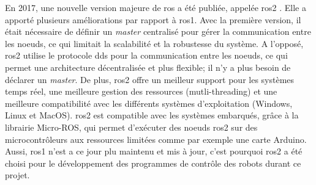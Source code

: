 En 2017, une nouvelle version majeure de \gls{ros} a été publiée, appelée \gls{ros2} \cite{noauthor_distributions_nodate}. Elle a apporté plusieurs améliorations par rapport à \gls{ros1}. Avec la première version, il était nécessaire de définir un \textit{master} centralisé pour gérer la communication entre les noeuds, ce qui limitait la scalabilité et la robustesse du système. A l'opposé, \gls{ros2} utilise le protocole \gls{dds} pour la communication entre les noeuds, ce qui permet une architecture décentralisée et plus flexible; il n'y a plus besoin de déclarer un \textit{master}. De plus, \gls{ros2} offre un meilleur support pour les systèmes temps réel, une meilleure gestion des ressources (mutli-threading) et une meilleure compatibilité avec les différents systèmes d'exploitation (Windows, Linux et MacOS). 
\gls{ros2} est compatible avec les systèmes embarqués, grâce à la librairie Micro-ROS, qui permet d'exécuter des noeuds \gls{ros2} sur des microcontrôleurs aux ressources limitées comme par exemple une carte Arduino. 
Aussi, \gls{ros1} n'est a ce jour plu maintenu et mis à jour, c'est pourquoi \gls{ros2} a été choisi pour le développement des programmes de contrôle des robots durant ce projet.

